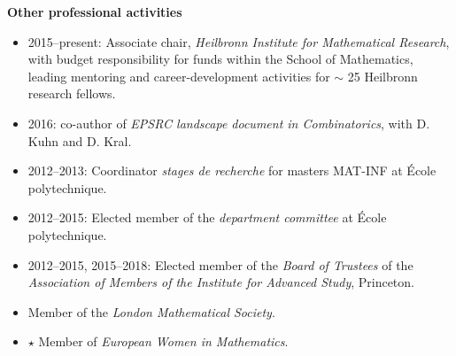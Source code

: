 \documentclass[11pt]{article}
\newenvironment{mitemize}{
\begin{itemize}
  \setlength{\itemsep}{1pt}
  \setlength{\parskip}{0pt}
  \setlength{\parsep}{0pt}
}{\end{itemize}}
\begin{document}
\vspace{3pt}
\textbf{Other professional activities}
\begin{mitemize}
\item 2015--present: Associate chair, \textit{Heilbronn Institute for Mathematical Research}, with budget responsibility for funds within the School of Mathematics, leading mentoring and career-development activities for $\sim$ 25 Heilbronn research fellows.
\item 2016: co-author of \emph{EPSRC landscape document in Combinatorics}, with D. Kuhn and D. Kral.
\item 2012--2013: Coordinator \textit{stages de recherche} for masters MAT-INF at \'Ecole polytechnique.
\item 2012--2015: Elected member of the \emph{department committee} at \'Ecole polytechnique.
\item2012--2015, 2015--2018: Elected member of the \textit{Board of Trustees} of the \emph{Association of Members of the Institute for Advanced Study}, Princeton.
\item Member of the \textit{London Mathematical Society}.
\item[$\star$] Member of \textit{European Women in Mathematics}.
\end{mitemize}

%
\end{document}
